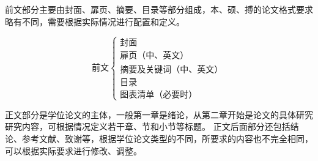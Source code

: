 前文部分主要由封面、扉页、摘要、目录等部分组成，本、硕、搏的论文格式要求略有不同，需要根据实际情况进行配置和定义。

\[
  \text{前文}
  \begin{cases}
    \text{封面}                     \\
    \text{扉页（中、英文）}         \\
    \text{摘要及关键词（中、英文）} \\
    \text{目录}                     \\
    \text{图表清单（必要时）}
  \end{cases}
\]

正文部分是学位论文的主体，一般第一章是绪论，从第二章开始是论文的具体研究研究内容，可根据情况定义若干章、节和小节等标题。
正文后面部分还包括结论、参考文献、致谢等，根据学位论文类型的不同，所要求的内容也不完全相同，可以根据实际要求进行修改、调整。

